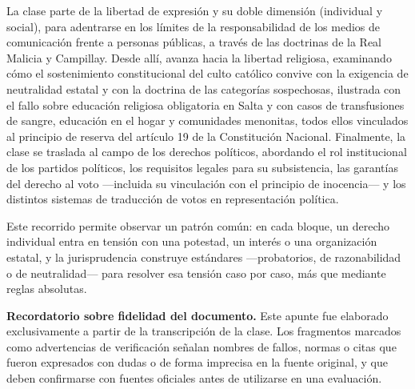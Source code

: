 \documentclass[12pt,oneside]{book}
\begin{document}
La clase parte de la libertad de expresión y su doble dimensión (individual y social), para adentrarse en los límites de la responsabilidad de los medios de comunicación frente a personas públicas, a través de las doctrinas de la Real Malicia y Campillay. Desde allí, avanza hacia la libertad religiosa, examinando cómo el sostenimiento constitucional del culto católico convive con la exigencia de neutralidad estatal y con la doctrina de las categorías sospechosas, ilustrada con el fallo sobre educación religiosa obligatoria en Salta y con casos de transfusiones de sangre, educación en el hogar y comunidades menonitas, todos ellos vinculados al principio de reserva del artículo 19 de la Constitución Nacional. Finalmente, la clase se traslada al campo de los derechos políticos, abordando el rol institucional de los partidos políticos, los requisitos legales para su subsistencia, las garantías del derecho al voto —incluida su vinculación con el principio de inocencia— y los distintos sistemas de traducción de votos en representación política.

Este recorrido permite observar un patrón común: en cada bloque, un derecho individual entra en tensión con una potestad, un interés o una organización estatal, y la jurisprudencia construye estándares —probatorios, de razonabilidad o de neutralidad— para resolver esa tensión caso por caso, más que mediante reglas absolutas.

\begin{important}
\textbf{Recordatorio sobre fidelidad del documento.} Este apunte fue elaborado exclusivamente a partir de la transcripción de la clase. Los fragmentos marcados como advertencias de verificación señalan nombres de fallos, normas o citas que fueron expresados con dudas o de forma imprecisa en la fuente original, y que deben confirmarse con fuentes oficiales antes de utilizarse en una evaluación.
\end{important}
\end{document}
